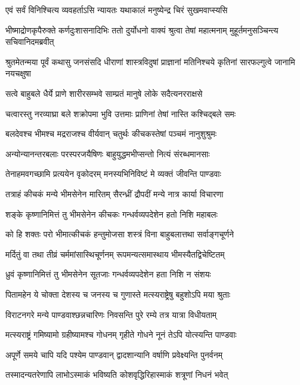 \twolineshloka
{एवं सर्वं विनिश्चित्य व्यवहर्ताऽसि न्यायतः}
{यथाकालं मनुष्येन्द्र चिरं सुखमवाप्स्यसि}


\threelineshloka
{भीष्माद्रोणकृपैरुक्ते कर्णदुःशासनादिभिः}
{ततो दुर्योधनो वाक्यं श्रुत्वा तेषां महात्मनाम्}
{मुहूर्तमनुसञ्चिन्त्य सचिवानिदमब्रवीत्}


\threelineshloka
{श्रुतमेतन्मया पूर्वं कथासु जनसंसदि}
{धीराणां शास्त्रविदुषां प्राज्ञानां मतिनिश्चये}
{कृतिनां सारफल्गुत्वे जानामि नयचक्षुषा}


\twolineshloka
{सत्वे बाहुबले धैर्ये प्राणे शारीरसम्भवे}
{साम्प्रतं मानुषे लोके सदैत्यनरराक्षसे}


\twolineshloka
{चत्वारस्तु नरव्याघ्रा बले शक्रोपमा भुवि}
{उत्तमाः प्राणिनां तेषां नास्ति कश्चिद्बले समः}


\twolineshloka
{बलदेवश्च भीमश्च मद्रराजश्च वीर्यवान्}
{चतुर्थः कीचकस्तेषां पञ्चमं नानुशुश्रुमः}


\twolineshloka
{अन्योन्यानन्तरबलाः परस्परजयैषिणः}
{बाहुयुद्धमभीप्सन्तो नित्यं संरब्धमानसाः}


\twolineshloka
{तेनाहमवगच्छामि प्रत्ययेन वृकोदरम्}
{मनस्यभिनिविष्टं मे व्यक्तं जीवन्ति पाण्डवाः}


\twolineshloka
{तत्राहं कीचकं मन्ये भीमसेनेन मारितम्}
{सैरन्ध्रीं द्रौपदीं मन्ये नात्र कार्या विचारणा}


\twolineshloka
{शङ्के कृष्णानिमित्तं तु भीमसेनेन कीचकः}
{गन्धर्वव्यपदेशेन हतो निशि महाबलः}


\twolineshloka
{को हि शक्तः परो भीमात्कीचकं हन्तुमोजसा}
{शस्त्रं विना बाहुबलात्तथा सर्वाङ्गचूर्णने}


\twolineshloka
{मर्दितुं वा तथा तीव्रं चर्ममांसास्थिचूर्णनम्}
{रूपमन्यत्समास्थाय भीमस्यैतद्विचेष्टितम्}


\twolineshloka
{ध्रुवं कृष्णानिमित्तं तु भीमसेनेन सूतजाः}
{गन्धर्वव्यपदेशेन हता निशि न संशयः}


\twolineshloka
{पितामहेन ये चोक्ता देशस्य च जनस्य च}
{गुणास्ते मत्स्यराष्ट्रेषु बहुशोऽपि मया श्रुताः}


\twolineshloka
{विराटनगरे मन्ये पाण्डवाश्छन्नचारिणः}
{निवसन्ति पुरे रम्ये तत्र यात्रा विधीयताम्}


\twolineshloka
{मत्स्यराष्ट्रं गमिष्यामो ग्रहीष्यामश्च गोधनम्}
{गृहीते गोधने नूनं तेऽपि योत्स्यन्ति पाण्डवाः}


\twolineshloka
{अपूर्णे समये चापि यदि पश्येम पाण्डवान्}
{द्वादशान्यानि वर्षाणि प्रवेक्ष्यन्ति पुनर्वनम्}


\twolineshloka
{तस्मादन्यतरेणापि लाभोऽस्माकं भविष्यति}
{कोशवृद्धिरिहास्माकं शत्रूणां निधनं भवेत्}


